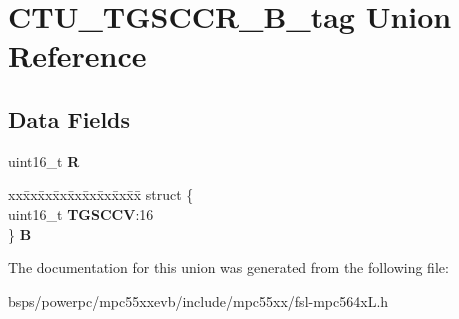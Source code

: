 \hypertarget{unionCTU__TGSCCR__16B__tag}{}\section{C\+T\+U\+\_\+\+T\+G\+S\+C\+C\+R\+\_\+B\+\_\+tag Union Reference}
\label{unionCTU__TGSCCR__16B__tag}
\subsection*{Data Fields}
\begin{DoxyCompactItemize}
\item 
\mbox{\label{unionCTU__TGSCCR__16B__tag_a335871f05ce41978252e55a6b38b103e}} 
uint16\+\_\+t {\bfseries R}
\item 
\mbox{\label{unionCTU__TGSCCR__16B__tag_a80eac99abcbb4344658ebb7838d681c5}} 
\begin{tabbing}
xx\=xx\=xx\=xx\=xx\=xx\=xx\=xx\=xx\=\kill
struct \{\\
\>uint16\_t {\bfseries TGSCCV}:16\\
\} {\bfseries B}\\

\end{tabbing}\end{DoxyCompactItemize}


The documentation for this union was generated from the following file\+:\begin{DoxyCompactItemize}
\item 
bsps/powerpc/mpc55xxevb/include/mpc55xx/fsl-\/mpc564x\+L.\+h\end{DoxyCompactItemize}
